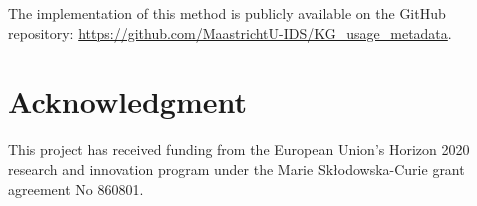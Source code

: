\documentclass[sw]{iosart2x}
\begin{document}
The implementation of this method is publicly available on the GitHub repository: \url{https://github.com/MaastrichtU-IDS/KG_usage_metadata}.


\section{Acknowledgment}\label{s7}
This project has received funding from the European Union’s Horizon 2020 research and innovation program under the Marie Skłodowska-Curie grant agreement No 860801.







\nocite{*}

%
\end{document}
